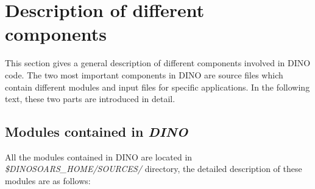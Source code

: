 \section{Description of different components}
\label{Description-components}
This section gives a general description of different components involved in DINO code. The two most important components in DINO are source files which contain different modules and input files for specific applications. In the following text, these two parts are introduced in detail.
\subsection{Modules contained in {\it DINO}}
All the modules contained in DINO are located in \textit{\$DINOSOARS\_HOME/SOURCES/} directory, the detailed description of these modules are as follows:
